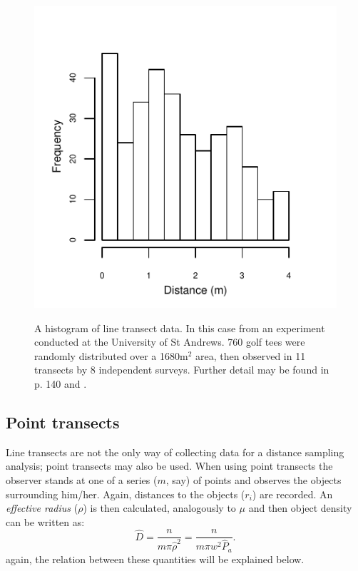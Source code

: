 \begin{figure}
\centering
\includegraphics{intro/figs/ds-golftee.pdf}\\
\caption{A histogram of line transect data. In this case from an experiment conducted at the University of St Andrews. 760 golf tees were randomly distributed over a 1680m$^2$ area, then observed in 11 transects by 8 independent surveys. Further detail may be found in  p. 140 and .}
\label{ds-lt-example}
\end{figure}

\subsection{Point transects}
Line transects are not the only way of collecting data for a distance sampling analysis; point transects may also be used. When using point transects the observer stands at one of a series ($m$, say) of points and observes the objects surrounding him/her. Again, distances to the objects ($r_i$) are recorded. An \textit{effective radius} ($\rho$) is then calculated, analogously to $\mu$ and then object density can be written as:
\begin{equation}
\hat{D}=\frac{n}{m \pi \hat{\rho}^2}=\frac{n}{m\pi w^2\hat{P}_a}.
\end{equation}
again, the relation between these quantities will be explained below.


